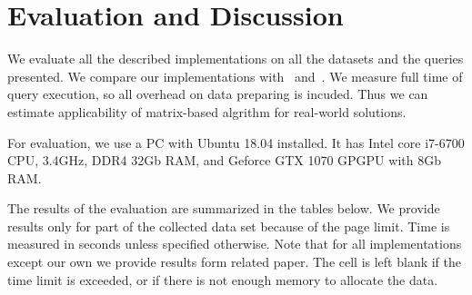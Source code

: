 \section{Evaluation and Discussion}

We evaluate all the described implementations on all the datasets and the queries presented.
We compare our implementations with~\cite{Mishin:2019:ECP:3327964.3328503} and~\cite{Kuijpers:2019:ESC:3335783.3335791}.
We measure full time of query execution, so all overhead on data preparing is incuded.
Thus we can estimate applicability of matrix-based algrithm for real-world solutions.

For evaluation, we use a PC with Ubuntu 18.04 installed.
It has Intel core i7-6700 CPU, 3.4GHz, DDR4 32Gb RAM, and Geforce GTX 1070 GPGPU with 8Gb RAM.

The results of the evaluation are summarized in the tables below.
We provide results only for part of the collected data set because of the page limit.
Time is measured in seconds unless specified otherwise.
Note that for all implementations except our own we provide results form related paper.
The cell is left blank if the time limit is exceeded, or if there is not enough memory to allocate the data. %

